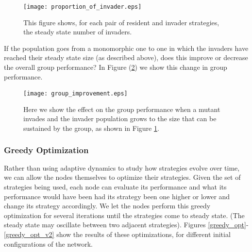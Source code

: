 \documentclass{article}
\begin{document}
\begin{figure}
\begin{center}
\texttt{[image: proportion\_of\_invader.eps]}
\end{center}
\caption{ \label{prop_of_invaders} This figure shows, for each pair of resident and invader strategies, the steady state number of invaders.  }
\end{figure}

If the population goes from a monomorphic one to one in which the invaders have reached their steady state size (as described above), does this improve or decrease the overall group performance?  In Figure (\ref{group_improvement}) we show this change in group performance.  

\begin{figure}
\begin{center}
\texttt{[image: group\_improvement.eps]}
\end{center}
\caption{ \label{group_improvement} Here we show the effect on the group performance when a mutant invades and the invader population grows to the size that can be sustained by the group, as shown in Figure \ref{prop_of_invaders}.}
\end{figure}

\subsubsection{Greedy Optimization}

Rather than using adaptive dynamics to study how strategies evolve over time, we can allow the nodes themselves to optimize their strategies.  Given the set of strategies being used, each node can evaluate its performance and what its performance would have been had its strategy been one higher or lower and change its strategy accordingly.  We let the nodes perform this greedy optimization for several iterations until the strategies come to steady state.  (The steady state may oscillate between two adjacent strategies).  
Figures \ref{greedy_opt}-\ref{greedy_opt_v2} show the results of these optimizations, for different initial configurations of the network.  
\end{document}
